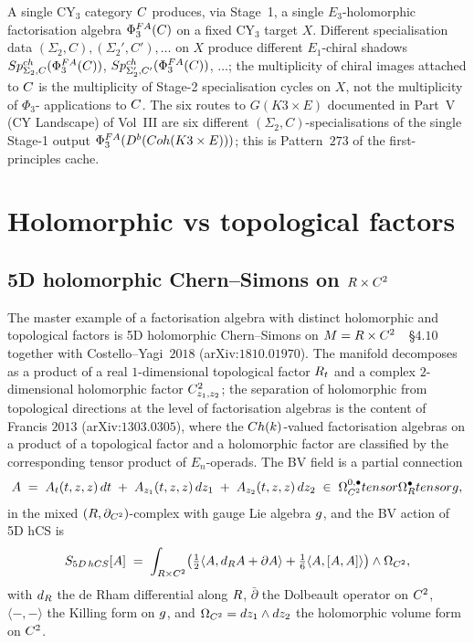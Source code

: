 \begin{remark}
\label{rem:six-sigma2-C-specialisations}
A single CY$_3$ category $C$ produces, via Stage~1, a single
$E_3$-holomorphic factorisation algebra $\Phi^{FA}_3(C)$ on a fixed
CY$_3$ target $X$. Different specialisation data
$(\Sigma_2, C), (\Sigma_2', C'), \dots$ on $X$ produce different
$E_1$-chiral shadows $Sp^{ch}_{\Sigma_2, C}(\Phi^{FA}_3(C))$,
$Sp^{ch}_{\Sigma_2', C'}(\Phi^{FA}_3(C))$, $\dots$; the multiplicity of
chiral images attached to $C$ is the multiplicity of Stage-2
specialisation cycles on $X$, not the multiplicity of $\Phi_3$-
applications to $C$. The six routes to $G(K3 \times E)$
documented in Part~V (CY Landscape) of Vol~III are six different
$(\Sigma_2, C)$-specialisations of the single Stage-1 output
$\Phi^{FA}_3(D^b(Coh(K3 \times E)))$; this is Pattern~$273$ of the
first-principles cache.
\end{remark}

\section{Holomorphic vs topological factors}
\label{sec:fa-hol-top}

\subsection{5D holomorphic Chern--Simons on $R \times C^2$}

The master example of a factorisation algebra with distinct holomorphic
and topological factors is 5D holomorphic Chern--Simons on
$M = R \times C^2$~\cite{CostelloGwilliam2017}~\S$4.10$ together with
Costello--Yagi~$2018$ (arXiv:$1810.01970$). The manifold decomposes as
a product of a real $1$-dimensional topological factor $R_t$ and a
complex $2$-dimensional holomorphic factor $C^2_{z_1, z_2}$; the
separation of holomorphic from topological directions at the level of
factorisation algebras is the content of Francis $2013$
(arXiv:$1303.0305$), where the $Ch(k)$-valued factorisation algebras
on a product of a topological factor and a holomorphic factor are
classified by the corresponding tensor product of $E_n$-operads.
The BV field is a partial connection
\begin{equation}
\label{eq:5d-hCS-field}
  A \;=\; A_t(t, z, z)\, dt
  \;+\; A_{z_1}(t, z, z)\, dz_1
  \;+\; A_{z_2}(t, z, z)\, dz_2
  \;\in\; \Omega^{0, \bullet}_{C^2} tensor \Omega^\bullet_{R}
  tensor g,
\end{equation}
in the mixed $(R, \partial_{C^2})$-complex with gauge Lie algebra
$g$, and the BV action of 5D hCS is
\begin{equation}
\label{eq:5d-hCS-action}
  S_{5D\,hCS}[A] \;=\; \int_{R \times C^2}
  \bigl(\tfrac{1}{2}\langle A, d_{R} A + \partial A\rangle
   + \tfrac{1}{6}\langle A, [A, A]\rangle\bigr) \wedge \Omega_{C^2},
\end{equation}
with $d_{R}$ the de Rham differential along $R$, $\bar\partial$ the
Dolbeault operator on $C^2$, $\langle -, -\rangle$ the Killing form on
$g$, and $\Omega_{C^2} = dz_1 \wedge dz_2$ the holomorphic volume
form on $C^2$.

